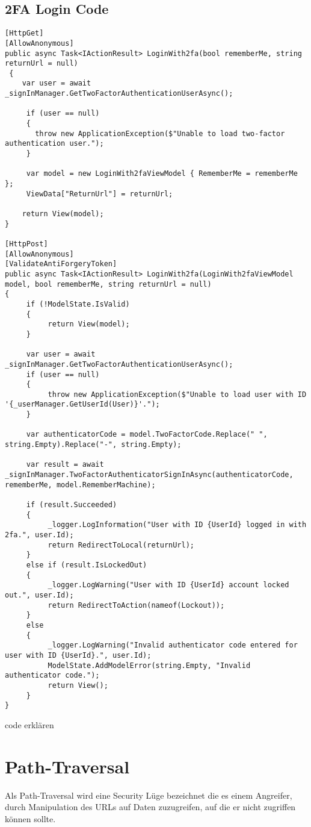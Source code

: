 \subsection{2FA Login Code}
\label{sec:2FALogin}
\begin{lstlisting}
[HttpGet]
[AllowAnonymous]
public async Task<IActionResult> LoginWith2fa(bool rememberMe, string returnUrl = null)
 {
    var user = await _signInManager.GetTwoFactorAuthenticationUserAsync();

     if (user == null)
     {
       throw new ApplicationException($"Unable to load two-factor authentication user.");
     }

     var model = new LoginWith2faViewModel { RememberMe = rememberMe };
     ViewData["ReturnUrl"] = returnUrl;

    return View(model);
}

[HttpPost]
[AllowAnonymous]
[ValidateAntiForgeryToken]
public async Task<IActionResult> LoginWith2fa(LoginWith2faViewModel model, bool rememberMe, string returnUrl = null)
{
     if (!ModelState.IsValid)
     {
          return View(model);
     }

     var user = await _signInManager.GetTwoFactorAuthenticationUserAsync();
     if (user == null)
     {
          throw new ApplicationException($"Unable to load user with ID '{_userManager.GetUserId(User)}'.");
     }

     var authenticatorCode = model.TwoFactorCode.Replace(" ", string.Empty).Replace("-", string.Empty);

     var result = await _signInManager.TwoFactorAuthenticatorSignInAsync(authenticatorCode, rememberMe, model.RememberMachine);

     if (result.Succeeded)
     {
          _logger.LogInformation("User with ID {UserId} logged in with 2fa.", user.Id);
          return RedirectToLocal(returnUrl);
     }
     else if (result.IsLockedOut)
     {
          _logger.LogWarning("User with ID {UserId} account locked out.", user.Id);
          return RedirectToAction(nameof(Lockout));
     }
     else
     {
          _logger.LogWarning("Invalid authenticator code entered for user with ID {UserId}.", user.Id);
          ModelState.AddModelError(string.Empty, "Invalid authenticator code.");
          return View();
     }
}
\end{lstlisting}
code erklären
\section{Path-Traversal}
\label{sec:Path-Traversal}
Als Path-Traversal wird eine Security Lüge bezeichnet die es einem Angreifer, durch Manipulation des URLs auf Daten zuzugreifen, auf die er nicht zugriffen können sollte. 
